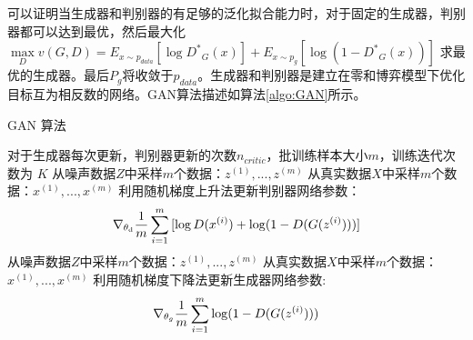 可以证明当生成器和判别器的有足够的泛化拟合能力时，对于固定的生成器，判别器都可以达到最优，然后最大化$\mathop {\max }\limits_D v(G,D) = {E_{x \sim {p_{data}}}}[\log {D^*}_G(x)] + {E_{x \sim {p_g}}}[\log (1 - {D^*}_G(x))]$ 求最优的生成器。最后$P_g$将收敛于${p_{data}}$。生成器和判别器是建立在零和博弈模型下优化目标互为相反数的网络。GAN算法描述如算法\ref{algo:GAN}所示。

\begin{algorithm}[htpb]
	\caption{GAN 算法}%
	\label{algo:GAN}
	\begin{algorithmic}[1]%
		\Require
		对于生成器每次更新，判别器更新的次数$n_{critic}$，批训练样本大小$m$，训练迭代次数为 $K$
		\State 从噪声数据$Z$中采样$m$个数据：${z^{(1)},...,z^{(m)}}$
		\State
		从真实数据$X$中采样$m$个数据：${x^{(1)},...,x^{(m)}}$ 
		\State 利用随机梯度上升法更新判别器网络参数：
		\begin{equation*}
			{\nabla _{{\theta _{\rm{d}}}}}\frac{{\rm{1}}}{m}\sum\limits_{i = 1}^m {[\log D({x^{(i)}}) + \log (1 - D(G({z^{(i)}})))]} 
		\end{equation*}
		\EndFor
		\State 从噪声数据$Z$中采样$m$个数据：${z^{(1)},...,z^{(m)}}$
		\State
		从真实数据$X$中采样$m$个数据：${x^{(1)},...,x^{(m)}}$ 
		\State 利用随机梯度下降法更新生成器网络参数:
		\begin{equation*}
		{\nabla _{{\theta _g}}}\frac{{\rm{1}}}{m}\sum\limits_{i = 1}^m {\log (1 - D(G({z^{(i)}})))}
		\end{equation*}
		\EndFor
	\end{algorithmic}
\end{algorithm}

